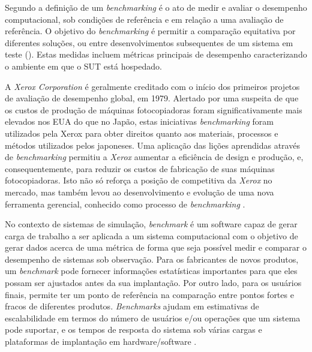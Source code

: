 Segundo \cite{Stefan2010} a definição de um \textit{benchmarking} é o ato de medir e avaliar o desempenho computacional, sob condições de referência e em relação a uma avaliação de referência. O objetivo do \textit{benchmarking} é permitir a comparação equitativa por diferentes soluções, ou entre desenvolvimentos subsequentes de um sistema em teste (). Estas medidas incluem métricas principais de desempenho caracterizando o ambiente em que o SUT está hospedado.

A \textit{Xerox Corporation} é geralmente creditado com o início dos primeiros projetos de avaliação de desempenho global, em 1979. Alertado por uma suspeita de que os custos de produção de máquinas fotocopiadoras foram significativamente mais elevados nos EUA do que no Japão, estas iniciativas \textit{benchmarking} foram utilizados pela Xerox para obter direitos quanto aos materiais, processos e métodos utilizados pelos japoneses. Uma aplicação das lições aprendidas através de \textit{benchmarking} permitiu a \textit{Xerox} aumentar a eficiência de design e produção, e, consequentemente, para reduzir os custos de fabricação de suas máquinas fotocopiadoras. Isto não só reforça a posição de competitiva da \textit{Xerox} no mercado, mas também levou ao desenvolvimento e evolução de uma nova ferramenta gerencial, conhecido como processo de \textit{benchmarking} \cite{Mahmoud2002}.

No contexto de sistemas de simulação, \textit{benchmark} é um software capaz de gerar carga de trabalho a ser aplicada a um sistema computacional com o objetivo de gerar dados acerca de uma métrica de forma que seja possível medir e comparar o desempenho de sistemas sob observação. Para os fabricantes de novos produtos, um \textit{benchmark} pode fornecer informações estatísticas importantes para que eles possam ser ajustados antes da sua implantação. Por outro lado, para os usuários finais, permite ter um ponto de referência na comparação entre pontos fortes e fracos de diferentes produtos. \textit{Benchmarks} ajudam em estimativas de escalabilidade em termos do número de usuários e/ou operações que um sistema pode suportar, e os tempos de resposta do sistema sob várias cargas e plataformas de implantação em hardware/software \cite{Jutla1999}.

